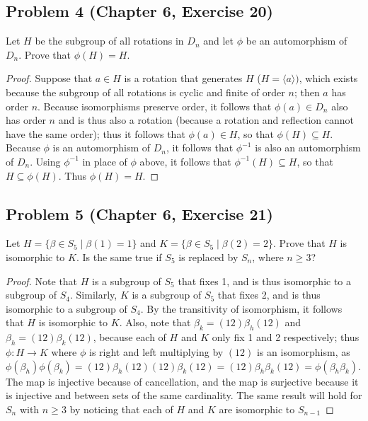 \documentclass{article}
\begin{document}
\subsection*{Problem 4 (Chapter 6, Exercise 20)}
Let $H$ be the subgroup of all rotations in $D_n$ and let $\phi$ be an automorphism of $D_n$. Prove that $\phi(H) = H$.
\begin{proof}
Suppose that $a \in H$ is a rotation that generates $H$ ($H = \langle a \rangle)$, which exists because the subgroup of all rotations is cyclic and finite of order $n$; then $a$ has order $n$. Because isomorphisms preserve order, it follows that $\phi(a) \in D_n$ also has order $n$ and is thus also a rotation (because a rotation and reflection cannot have the same order); thus it follows that $\phi(a) \in H$, so that $\phi(H) \subseteq H$. Because $\phi$ is an automorphism of $D_n$, it follows that $\phi^{-1}$ is also an automorphism of $D_n$. Using $\phi^{-1}$ in place of $\phi$ above, it follows that $\phi^{-1}(H) \subseteq H$, so that $H \subseteq \phi(H)$. Thus $\phi(H) = H$.
\end{proof}

\subsection*{Problem 5 (Chapter 6, Exercise 21)}

Let $H = \{\beta \in S_5 \mid \beta(1) = 1\}$ and $K = \{\beta \in S_5 \mid \beta(2) = 2\}$. Prove that $H$ is isomorphic to $K$. Is the same true if $S_5$ is replaced by $S_n$, where $n \geq 3$?

\begin{proof}

Note that $H$ is a subgroup of $S_5$ that fixes 1, and is thus isomorphic to a subgroup of $S_4$. Similarly, $K$ is a subgroup of $S_5$ that fixes 2, and is thus isomorphic to a subgroup of $S_4$. By the transitivity of isomorphism, it follows that $H$ is isomorphic to $K$. Also, note that $\beta_k = (12)\beta_h(12)$ and $\beta_h = (12)\beta_k(12)$, because each of $H$ and $K$ only fix 1 and 2 respectively; thus $\phi \colon H \to K$ where $\phi$ is right and left multiplying by $(12)$ is an isomorphism, as $\phi(\beta_h)\phi(\beta_k) = (12)\beta_h(12)(12)\beta_k(12) = (12)\beta_h\beta_k(12) = \phi(\beta_h\beta_k)$. The map is injective because of cancellation, and the map is surjective because it is injective and between sets of the same cardinality. The same result will hold for $S_n$ with $n \geq 3$ by noticing that each of $H$ and $K$ are isomorphic to $S_{n-1}$

\end{proof}
\end{document}
